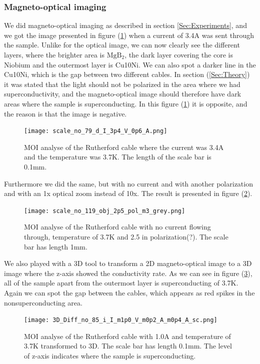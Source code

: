 \documentclass{comjnl}
\newcommand*\chem[1]{\ensuremath{\mathrm{#1}}}
\begin{document}
\subsubsection{Magneto-optical imaging}
We did magneto-optical imaging as described in section \ref{Sec:Experiments}, and we got the image presented in figure (\ref{fig:moi2d1}) when a current of 3.4A was sent through the sample. Unlike for the optical image, we can now clearly see the different layers, where the brighter area is \chem{MgB_2}, the dark layer covering the core is Niobium and the outermost layer is Cu10Ni. We can also spot a darker line in the Cu10Ni, which is the gap between two different cables. In section (\ref{Sec:Theory}) it was stated that the light should not be polarized in the area where we had superconductivity, and the magneto-optical image should therefore have dark areas where the sample is superconducting. In this figure (\ref{fig:moi2d1}) it is opposite, and the reason is that the image is negative. 
\begin{figure}[h]
\centering
\texttt{[image: scale\_no\_79\_d\_I\_3p4\_V\_0p6\_A.png]}
\caption{MOI analyse of the Rutherford cable where the current was 3.4A and the temperature was 3.7K. The length of the scale bar is 0.1mm. \label{fig:moi2d1}}
\end{figure}

Furthermore we did the same, but with no current and with another polarization and with an 1x optical zoom instead of 10x. The result is presented in figure (\ref{fig:moi2d2}). 
\begin{figure}[h]
\centering
\texttt{[image: scale\_no\_119\_obj\_2p5\_pol\_m3\_grey.png]}
\caption{MOI analyse of the Rutherford cable with no current flowing through, temperature of 3.7K and 2.5 in polarization(?). The scale bar has length 1mm. \label{fig:moi2d2}}
\end{figure}

We also played with a 3D tool to transform a 2D magneto-optical image to a 3D image where the z-axis showed the conductivity rate. As we can see in figure (\ref{fig:moi3d}), all of the sample apart from the outermost layer is superconducting of 3.7K. Again we can spot the gap between the cables, which appears as red spikes in the nonsuperconducting area. 
\begin{figure}[h]
\centering
\texttt{[image: 3D\_Diff\_no\_85\_i\_I\_m1p0\_V\_m0p2\_A\_m0p4\_A\_sc.png]}
\caption{MOI analyse of the Rutherford cable with 1.0A and temperature of 3.7K transformed to 3D. The scale bar has length 0.1mm. The level of z-axis indicates where the sample is superconducting.\label{fig:moi3d}}
\end{figure}
\end{document}
